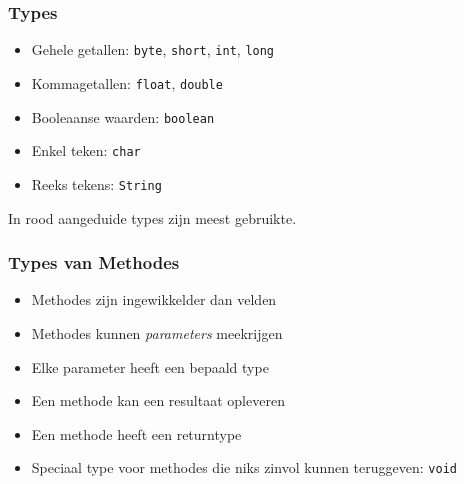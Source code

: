 \begin{frame}
  \frametitle{Types}
  \begin{itemize}
    \item Gehele getallen: {\tt byte}, {\tt short}, \alert{\tt int}, {\tt long}
    \item Kommagetallen: {\tt float}, \alert{\tt double}
    \item Booleaanse waarden: \alert{\tt boolean}
    \item Enkel teken: \alert{\tt char}
    \item Reeks tekens: \alert{\tt String}
  \end{itemize}
  \vskip4mm
  In rood aangeduide types zijn meest gebruikte.
\end{frame}

\begin{frame}
  \frametitle{Types van Methodes}
  \begin{itemize}
    \item Methodes zijn ingewikkelder dan velden
    \item Methodes kunnen \emph{parameters} meekrijgen
    \item Elke parameter heeft een bepaald type
    \item Een methode kan een resultaat opleveren
    \item Een methode heeft een returntype
    \item Speciaal type voor methodes die niks zinvol kunnen teruggeven: {\tt void}
  \end{itemize}
\end{frame}

